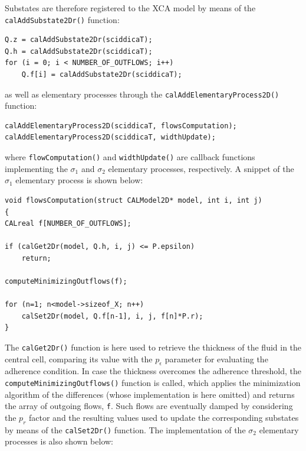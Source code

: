 Substates are therefore registered to the XCA model by means of the
\verb'calAddSubstate2Dr()' function:

\begin{lstlisting}
Q.z = calAddSubstate2Dr(sciddicaT);
Q.h = calAddSubstate2Dr(sciddicaT);
for (i = 0; i < NUMBER_OF_OUTFLOWS; i++)
	Q.f[i] = calAddSubstate2Dr(sciddicaT);
\end{lstlisting}

\noindent as well as elementary processes through the
\verb'calAddElementaryProcess2D()' function:

\begin{lstlisting}
calAddElementaryProcess2D(sciddicaT, flowsComputation);
calAddElementaryProcess2D(sciddicaT, widthUpdate);
\end{lstlisting}

\noindent where \verb'flowComputation()' and \verb'widthUpdate()'
are callback functions implementing the $\sigma_1$ and $\sigma_2$
elementary processes, respectively. A snippet of the $\sigma_1$
elementary process is shown below:

\begin{lstlisting}
void flowsComputation(struct CALModel2D* model, int i, int j)
{
CALreal f[NUMBER_OF_OUTFLOWS];

if (calGet2Dr(model, Q.h, i, j) <= P.epsilon)
	return;

computeMinimizingOutflows(f);

for (n=1; n<model->sizeof_X; n++)
	calSet2Dr(model, Q.f[n-1], i, j, f[n]*P.r);
}
\end{lstlisting}

\noindent The \verb'calGet2Dr()' function is here used to retrieve
the thickness of the fluid in the central cell, comparing its value
with the $p_\epsilon$ parameter for evaluating the adherence
condition. In case the thickness overcomes the adherence threshold,
the \verb'computeMinimizingOutflows()' function is called, which
applies the minimization algorithm of the differences (whose
implementation is here omitted) and returns the array of outgoing
flows, \verb'f'. Such flows are eventually damped by considering the
$p_r$ factor and the resulting values used to update the
corresponding substates by means of the \verb'calSet2Dr()'
function. The implementation of the $\sigma_2$ elementary processes
is also shown below:

